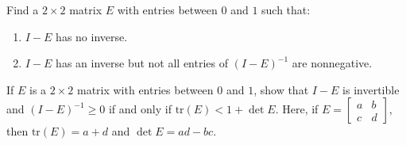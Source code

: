 \documentclass{ximera}
\begin{document}
\begin{problem}\label{prob:2x2examples}
Find a $2 \times 2$ matrix $E$ with entries between $0$ and $1$ such that:

\begin{enumerate}
\item\label{prob:i/o_11} $I - E$ has no inverse.

\item\label{prob:i/o_12} $I - E$ has an inverse but not all entries of $(I - E)^{-1}$ are nonnegative.

\end{enumerate}

\end{problem}

\begin{problem}\label{prob:i/o_13}
If $E$ is a $2 \times 2$ matrix with entries between $0$ and $1$, show that $I - E$ is invertible and $(I - E)^{-1} \geq 0$ if and only if $\mbox{tr}(E) < 1 + \det E$. Here, if $E = \left[ \begin{array}{rr}
a & b \\
c & d
\end{array} \right]$,
 then $\mbox{tr}(E) = a + d$ and $\det E = ad - bc$.

\end{problem}
\end{document}
